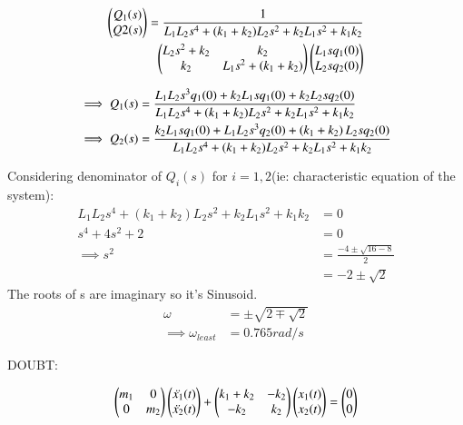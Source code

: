 \documentclass[journal,12pt,twocolumn]{IEEEtran}
\theoremstyle{remark}
\begin{document}
\begin{align}
\begin{pmatrix}
Q_1(s) \\
Q2(s)
\end{pmatrix}
= \frac{1}{L_1L_2s^4+(k_1+k_2)L_2s^2+k_2L_1s^2+k_1k_2} \nonumber \\
\begin{pmatrix}
L_2s^2+k_2 & k_2  \\
k_2& L_1s^2 + \left(k_1+k_2\right)
\end{pmatrix}
\begin{pmatrix}
L_1sq_1(0) \\
L_2sq_2(0)
\end{pmatrix}
\end{align}

\begin{align}
\implies Q_1(s)&=\frac{L_1L_2s^3q_1(0)+k_2L_1sq_1(0)+k_2L_2sq_2(0)}{L_1L_2s^4+(k_1+k_2)L_2s^2+k_2L_1s^2+k_1k_2} \\
\implies Q_2(s)&= \frac{k_2L_1sq_1(0)+L_1L_2s^3q_2(0)+\left(k_1+k_2\right)L_2sq_2(0)}{L_1L_2s^4+(k_1+k_2)L_2s^2+k_2L_1s^2+k_1k_2} 
\end{align}

Considering denominator of $Q_i(s)$ for $i=1,2$(ie: characteristic equation of the system):
\begin{align}
L_1L_2s^4+(k_1+k_2)L_2s^2+k_2L_1s^2+k_1k_2 &=0 \\
s^4 +4s^2+2&=0\\
\implies s^2&=\frac{-4\pm \sqrt{16-8}}{2} \\
&= -2 \pm \sqrt{2} 
\end{align}
The roots of s are imaginary so it's Sinusoid.
\begin{align}
\omega&=\pm\sqrt{2\mp \sqrt{2}}\\
\implies \omega_{least} &= 0.765 rad/s
\end{align} 


DOUBT:

\begin{align}
\begin{pmatrix}
m_1 & 0  \\
0 & m_2
\end{pmatrix}
\begin{pmatrix}
\ddot{x_1}(t) \\
\ddot{x_2}(t)
\end{pmatrix}
+
\begin{pmatrix}
k_1+k_2 & -k_2  \\
-k_2 & k_2
\end{pmatrix}
\begin{pmatrix}
x_1(t) \\
x_2(t)
\end{pmatrix}
=
\begin{pmatrix}
0 \\
0
\end{pmatrix}
\end{align}
\end{document}
